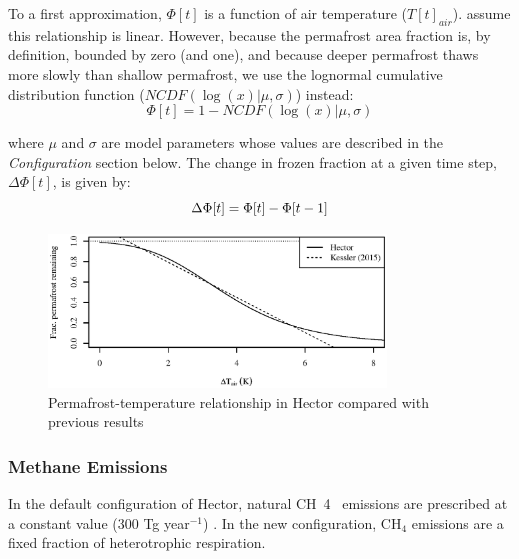 \documentclass[essd, manuscript]{copernicus}
\begin{document}
To a first approximation, $\Phi[t]$ is a function of air temperature ($T[t]_{air}$).
\citet{kessler_2017_estimating} assume this relationship is linear.
However, because the permafrost area fraction is, by definition, bounded by zero (and one\footnotemark), and because deeper permafrost thaws more slowly than shallow permafrost, we use the lognormal cumulative distribution function ($NCDF(\log(x) | \mu, \sigma)$) instead: \begin{equation}
\Phi[t] = 1 - NCDF(\log(x) | \mu, \sigma)
\end{equation}

where $\mu$ and $\sigma$ are model parameters whose values are described in the \textit{Configuration} section below.
The change in frozen fraction at a given time step, $\Delta \Phi[t]$, is given by:
\begin{equation}
\Delta \Phi[t] = \Phi[t] - \Phi[t-1]\\
\end{equation}

\begin{figure}
    \centering
    \includegraphics[width=0.8\textwidth]{figures/hector_vs_kessler.eps}
    \caption{Permafrost-temperature relationship in Hector compared with previous results}
    \label{fig:kessler}
\end{figure}


\subsubsection{Methane Emissions}
In the default configuration of Hector, natural CH~4~ emissions are prescribed at a constant value (300 Tg year$^{-1}$) \citep{hartin_2015_simple}.
In the new configuration, CH$_4$ emissions are a fixed fraction of heterotrophic respiration.
\end{document}
